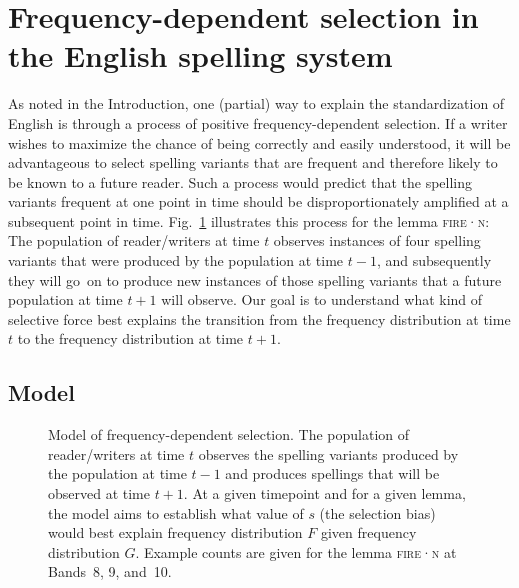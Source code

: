 \documentclass[doc,biblatex]{apa7}
\newcommand\lemma[2]{\textsc{#1·#2}}
\begin{document}

\section{Frequency-dependent selection in the English spelling system}

As noted in the Introduction, one (partial) way to explain the standardization of English is through a process of positive frequency-dependent selection. If a writer wishes to maximize the chance of being correctly and easily understood, it will be advantageous to select spelling variants that are frequent and therefore likely to be known to a future reader. Such a process would predict that the spelling variants frequent at one point in time should be disproportionately amplified at a subsequent point in time. Fig.~\ref{fds} illustrates this process for the lemma \lemma{fire}{n}: The population of reader/writers at time $t$ observes instances of four spelling variants that were produced by the population at time $t-1$, and subsequently they will go~on to produce new instances of those spelling variants that a future population at time $t+1$ will observe. Our goal is to understand what kind of selective force best explains the transition from the frequency distribution at time $t$ to the frequency distribution at time $t+1$.

\subsection{Model}

	\begin{figure}
	\vspace*{2pt}
	\caption{Model of frequency-dependent selection. The population of reader/writers at time $t$ observes the spelling variants produced by the population at time $t-1$ and produces spellings that will be observed at time $t+1$. At a given timepoint and for a given lemma, the model aims to establish what value of $s$ (the selection bias) would best explain frequency distribution $F$ given frequency distribution $G$. Example counts are given for the lemma \lemma{fire}{n} at Bands~8, 9, and~10.}
	\label{fds}
	\end{figure}
\end{document}
